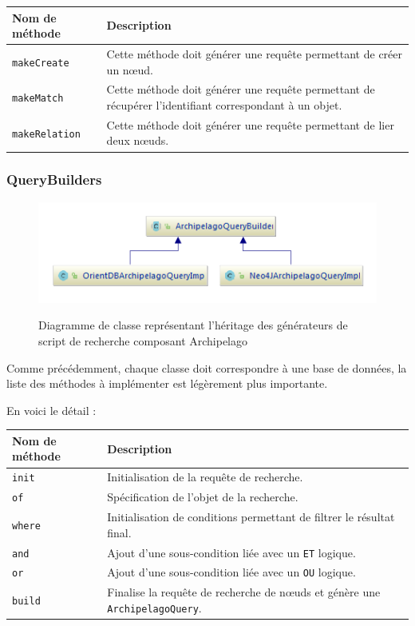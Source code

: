 \documentclass[a4paper,fleqn,12pt]{report}
\begin{document}
\begin{tabular}[c]{|l|M{12cm}|}

\hline
\textbf{Nom de méthode} & \textbf{Description}  \tabularnewline
\hline
\texttt{makeCreate} &  Cette méthode doit générer une requête permettant de créer un nœud. \tabularnewline
\hline
\texttt{makeMatch} & Cette méthode doit générer une requête permettant de récupérer l'identifiant correspondant à un objet. \tabularnewline
\hline
\texttt{makeRelation} &  Cette méthode doit générer une requête permettant de lier deux nœuds.  \tabularnewline
\hline

\end{tabular}

\subsubsection{QueryBuilders}

\begin{figure}[!ht]
\centering
\includegraphics[scale=1.5]{figures/queryBuilders.png}
\label{fig:QueryBuilders}
\caption{Diagramme de classe représentant l'héritage des générateurs de script de recherche composant Archipelago}
\end{figure}

Comme précédemment, chaque classe doit correspondre à une base de données, la liste des méthodes à implémenter est légèrement plus importante.

En voici le détail :

\begin{tabular}[c]{|l|M{12cm}|}

\hline
\textbf{Nom de méthode} & \textbf{Description}  \tabularnewline
\hline
\texttt{init} & Initialisation de la requête de recherche.  \tabularnewline
\hline
\texttt{of} & Spécification de l'objet de la recherche.  \tabularnewline
\hline
\texttt{where} & Initialisation de conditions permettant de filtrer le résultat final.  \tabularnewline
\hline
\texttt{and} & Ajout d'une sous-condition liée avec un \texttt{ET} logique. \tabularnewline
\hline
\texttt{or} & Ajout d'une sous-condition liée avec un \texttt{OU} logique.   \tabularnewline
\hline
\texttt{build} & Finalise la requête de recherche de nœuds et génère une \texttt{ArchipelagoQuery}.   \tabularnewline \hline

\end{tabular}
\end{document}

